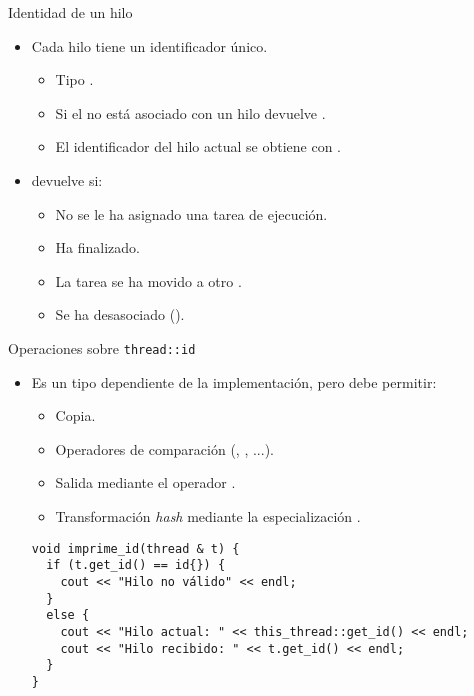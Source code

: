 \begin{frame}[t]{Identidad de un hilo}
\begin{itemize}
  \item Cada hilo tiene un identificador único.
    \begin{itemize}
      \item Tipo .
      \item Si el  no está asociado con un hilo  devuelve .
      \item El identificador del hilo actual se obtiene con .
    \end{itemize}

  \item {} devuelve  si:
    \begin{itemize}
      \item No se le ha asignado una tarea de ejecución.
      \item Ha finalizado.
      \item La tarea se ha movido a otro .
      \item Se ha desasociado ().
    \end{itemize}
\end{itemize}
\end{frame}

\begin{frame}[t,fragile]{Operaciones sobre \texttt{thread::id}}
\begin{itemize}
  \item Es un tipo dependiente de la implementación, pero debe permitir:
    \begin{itemize}
      \item Copia.
      \item Operadores de comparación (\cppid{==}, \cppid{<}, ...).
      \item Salida mediante el operador \cppid{<<}.
      \item Transformación \emph{hash} mediante la especialización .
    \end{itemize}
\begin{lstlisting}
void imprime_id(thread & t) {
  if (t.get_id() == id{}) {
    cout << "Hilo no válido" << endl;
  }
  else {
    cout << "Hilo actual: " << this_thread::get_id() << endl;
    cout << "Hilo recibido: " << t.get_id() << endl;
  }
}
\end{lstlisting}
\end{itemize}
\end{frame}

